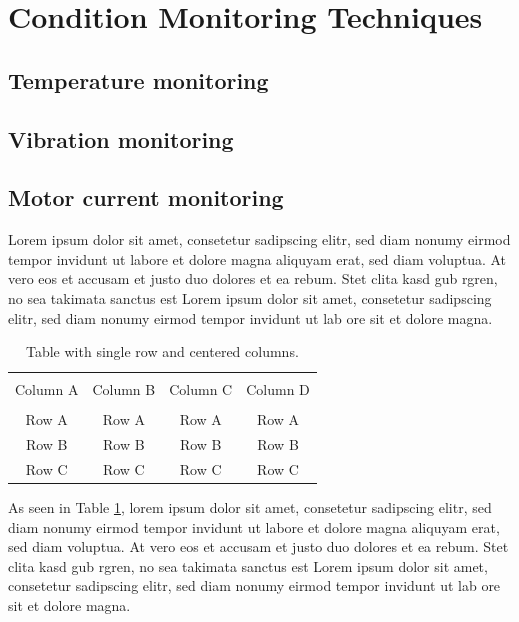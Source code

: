 \section{Condition Monitoring Techniques}

\subsection{Temperature monitoring}
\subsection{Vibration monitoring}
\subsection{Motor current monitoring}


Lorem ipsum dolor sit amet, consetetur sadipscing elitr, sed diam nonumy eirmod tempor invidunt ut labore et dolore magna aliquyam erat, sed diam voluptua. At vero eos et accusam et justo duo dolores et ea rebum. Stet clita kasd gub rgren, no sea takimata sanctus est Lorem ipsum dolor sit amet, consetetur sadipscing elitr, sed diam nonumy eirmod tempor invidunt ut lab ore sit et dolore magna.

\begin{table}[h]
	{\setlength{\tabcolsep}{14pt}
		\caption{Table with single row and centered columns.}
		\begin{center}
			\vspace{-6mm}
			\begin{tabular}{cccc}
				\hline \\[-2.45ex] \hline \\[-2.1ex]
				Column A & Column B & Column C & Column D \\
				\hline \\[-1.8ex]
				Row A & Row A & Row A & Row A \\
				Row B & Row B & Row B & Row B \\
				Row C & Row C & Row C & Row C \\
				\hline
			\end{tabular}
			\vspace{-6mm}
		\end{center}
		\label{Table2.1}}
\end{table}

As seen in Table \ref{Table2.1}, lorem ipsum dolor sit amet, consetetur sadipscing elitr, sed diam nonumy eirmod tempor invidunt ut labore et dolore magna aliquyam erat, sed diam voluptua. At vero eos et accusam et justo duo dolores et ea rebum. Stet clita kasd gub rgren, no sea takimata sanctus est Lorem ipsum dolor sit amet, consetetur sadipscing elitr, sed diam nonumy eirmod tempor invidunt ut lab ore sit et dolore magna.

